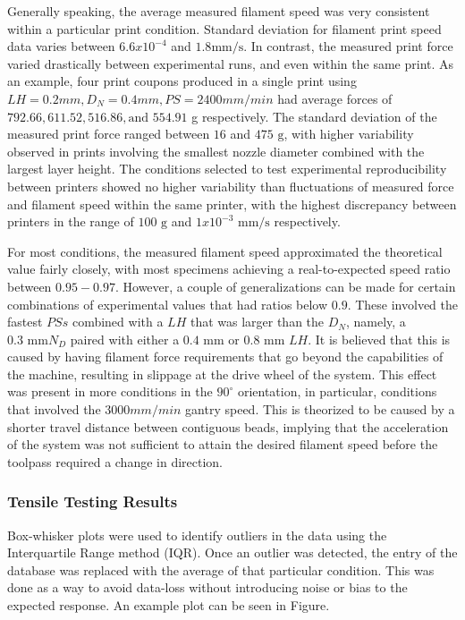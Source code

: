 \documentclass[main.tex]{subfiles}
\begin{document}
Generally speaking, the average measured filament speed was very consistent within a particular print condition. Standard deviation for filament print speed data varies between $6.6x10^{-4}$ and $1.8 \text{mm/s}$. In contrast, the measured print force varied drastically between experimental runs, and even within the same print. As an example, four print coupons produced in a single print using $LH= 0.2 mm, D_{N} = 0.4 mm, PS = 2400 mm/min$ had average forces of $792.66, 611.52, 516.86, \text{and } 554.91$ g respectively. The standard deviation of the measured print force ranged between $16$ and $475\text{ g}$, with higher variability observed in prints involving the smallest nozzle diameter combined with the largest layer height. The conditions selected to test experimental reproducibility between printers showed no higher variability than fluctuations of measured force and filament speed within the same printer, with the highest discrepancy between printers in the range of $100 \text{ g}$ and $1x10^{-3} \text{ mm/s}$ respectively. 

For most conditions, the measured filament speed approximated the theoretical value fairly closely, with most specimens achieving a real-to-expected speed ratio between $0.95-0.97$. However, a couple of generalizations can be made for certain combinations of experimental values that had ratios below $0.9$. These involved the fastest $PSs$ combined with a $LH$ that was larger than the $D_{N}$, namely, a $0.3 \text{ mm} N_{D}$ paired with either a $0.4 \text{ mm}$ or $0.8 \text{ mm}$ $LH$. It is believed that this is caused by having filament force requirements that go beyond the capabilities of the machine, resulting in slippage at the drive wheel of the system. This effect was present in more conditions in the $90^{\circ}$ orientation, in particular, conditions that involved the $3000 mm/min$ gantry speed. This is theorized to be caused by a shorter travel distance between contiguous beads, implying that the acceleration of the system was not sufficient to attain the desired filament speed before the toolpass required a change in direction. 

\subsubsection{Tensile Testing Results}

Box-whisker plots were used to identify outliers in the data using the Interquartile Range method (IQR). Once an outlier was detected, the entry of the database was replaced with the average of that particular condition. This was done as a way to avoid data-loss without introducing noise or bias to the expected response. An example plot can be seen in Figure. %
\end{document}
